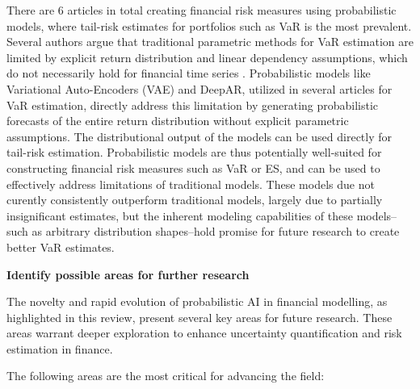 There are 6 articles in total creating financial risk measures using probabilistic models, where tail-risk estimates for portfolios such as VaR is the most prevalent. Several authors argue that traditional parametric methods for VaR estimation are limited by explicit return distribution and linear dependency assumptions, which do not necessarily hold for financial time series \parencite{arian2022encoded,Fatouros2023DeepVaR}. Probabilistic models like Variational Auto-Encoders (VAE) and DeepAR, utilized in several articles for VaR estimation, directly address this limitation by generating probabilistic forecasts of the entire return distribution without explicit parametric assumptions. The distributional output of the models can be used directly for tail-risk estimation. Probabilistic models are thus potentially well-suited for constructing financial risk measures such as VaR or ES, and can be used to effectively address limitations of traditional models. These models due not curently consistently outperform traditional models, largely due to partially insignificant estimates, but the inherent modeling capabilities of these models--such as arbitrary distribution shapes--hold promise for future research to create better VaR estimates.

\textbf{Identify possible areas for further research}\nopagebreak

The novelty and rapid evolution of probabilistic AI in financial modelling, as highlighted in this review, present several key areas for future research. These areas warrant deeper exploration to enhance uncertainty quantification and risk estimation in finance.

The following areas are the most critical for advancing the field:

